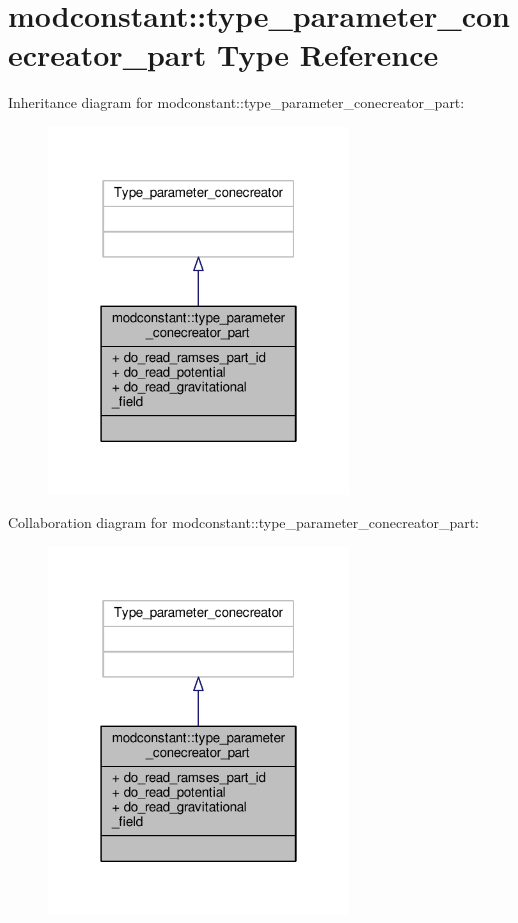 \hypertarget{structmodconstant_1_1type__parameter__conecreator__part}{}\section{modconstant\+:\+:type\+\_\+parameter\+\_\+conecreator\+\_\+part Type Reference}
\label{structmodconstant_1_1type__parameter__conecreator__part}


Inheritance diagram for modconstant\+:\+:type\+\_\+parameter\+\_\+conecreator\+\_\+part\+:\nopagebreak
\begin{figure}[H]
\begin{center}
\leavevmode
\includegraphics[width=226pt]{structmodconstant_1_1type__parameter__conecreator__part__inherit__graph}
\end{center}
\end{figure}


Collaboration diagram for modconstant\+:\+:type\+\_\+parameter\+\_\+conecreator\+\_\+part\+:\nopagebreak
\begin{figure}[H]
\begin{center}
\leavevmode
\includegraphics[width=226pt]{structmodconstant_1_1type__parameter__conecreator__part__coll__graph}
\end{center}
\end{figure}
